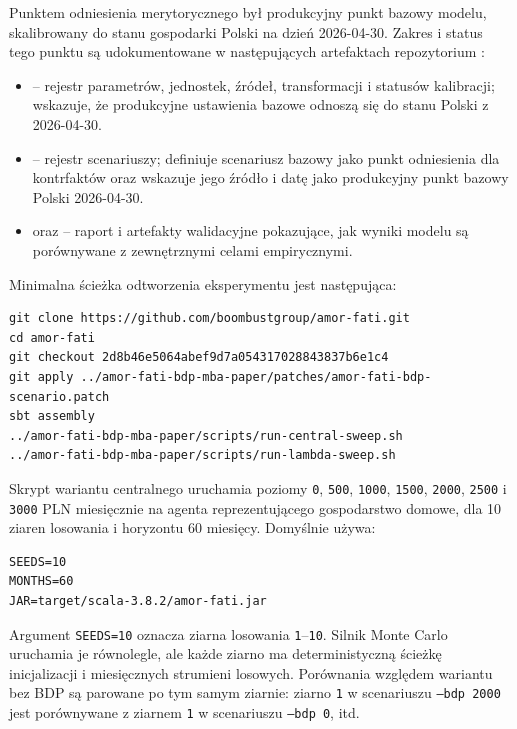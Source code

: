 Punktem odniesienia merytorycznego był produkcyjny punkt bazowy modelu, skalibrowany do stanu gospodarki Polski na dzień 2026-04-30. Zakres i status tego punktu są udokumentowane w następujących artefaktach repozytorium \amor{}:

\begin{itemize}
    \item {} -- rejestr parametrów, jednostek, źródeł, transformacji i statusów kalibracji; wskazuje, że produkcyjne ustawienia bazowe odnoszą się do stanu Polski z 2026-04-30.
    \item {} -- rejestr scenariuszy; definiuje scenariusz bazowy jako punkt odniesienia dla kontrfaktów oraz wskazuje jego źródło i datę jako produkcyjny punkt bazowy Polski 2026-04-30.
    \item {} oraz  -- raport i artefakty walidacyjne pokazujące, jak wyniki modelu są porównywane z zewnętrznymi celami empirycznymi.
\end{itemize}

Minimalna ścieżka odtworzenia eksperymentu jest następująca:

\begin{verbatim}
git clone https://github.com/boombustgroup/amor-fati.git
cd amor-fati
git checkout 2d8b46e5064abef9d7a054317028843837b6e1c4
git apply ../amor-fati-bdp-mba-paper/patches/amor-fati-bdp-scenario.patch
sbt assembly
../amor-fati-bdp-mba-paper/scripts/run-central-sweep.sh
../amor-fati-bdp-mba-paper/scripts/run-lambda-sweep.sh
\end{verbatim}

Skrypt wariantu centralnego uruchamia poziomy \texttt{0}, \texttt{500}, \texttt{1000}, \texttt{1500}, \texttt{2000}, \texttt{2500} i \texttt{3000} PLN miesięcznie na agenta reprezentującego gospodarstwo domowe, dla 10 ziaren losowania i horyzontu 60 miesięcy. Domyślnie używa:

\begin{verbatim}
SEEDS=10
MONTHS=60
JAR=target/scala-3.8.2/amor-fati.jar
\end{verbatim}

Argument \texttt{SEEDS=10} oznacza ziarna losowania \texttt{1}--\texttt{10}. Silnik Monte Carlo uruchamia je równolegle, ale każde ziarno ma deterministyczną ścieżkę inicjalizacji i miesięcznych strumieni losowych. Porównania względem wariantu bez BDP są parowane po tym samym ziarnie: ziarno \texttt{1} w scenariuszu \texttt{--bdp 2000} jest porównywane z ziarnem \texttt{1} w scenariuszu \texttt{--bdp 0}, itd.

